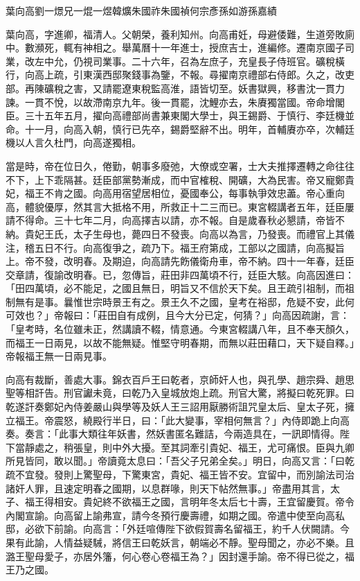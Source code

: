 
\begin{pinyinscope}
葉向高劉一燝兄一焜一煜韓爌朱國祚朱國禎何宗彥孫如游孫嘉績

葉向高，字進卿，福清人。父朝榮，養利知州。向高甫妊，母避倭難，生道旁敗廁中。數瀕死，輒有神相之。舉萬曆十一年進士，授庶吉士，進編修。遷南京國子司業，改左中允，仍視司業事。二十六年，召為左庶子，充皇長子侍班官。礦稅橫行，向高上疏，引東漢西邸聚錢事為鑒，不報。尋擢南京禮部右侍郎。久之，改吏部。再陳礦稅之害，又請罷遼東稅監高淮，語皆切至。妖書獄興，移書沈一貫力諫。一貫不悅，以故滯南京九年。後一貫罷，沈鯉亦去，朱賡獨當國。帝命增閣臣。三十五年五月，擢向高禮部尚書兼東閣大學士，與王錫爵、于慎行、李廷機並命。十一月，向高入朝，慎行已先卒，錫爵堅辭不出。明年，首輔賡亦卒，次輔廷機以人言久杜門，向高遂獨相。

當是時，帝在位日久，倦勤，朝事多廢弛，大僚或空署，士大夫推擇遷轉之命往往不下，上下乖隔甚。廷臣部黨勢漸成，而中官榷稅、開礦，大為民害。帝又寵鄭貴妃，福王不肯之國。向高用宿望居相位，憂國奉公，每事執爭效忠藎。帝心重向高，體貌優厚，然其言大抵格不用，所救正十二三而已。東宮輟講者五年，廷臣屢請不得命。三十七年二月，向高擇吉以請，亦不報。自是歲春秋必懇請，帝皆不納。貴妃王氏，太子生母也，薨四日不發喪。向高以為言，乃發喪。而禮官上其儀注，稽五日不行。向高復爭之，疏乃下。福王府第成，工部以之國請，向高擬旨上。帝不發，改明春。及期迫，向高請先飭儀衛舟車，帝不納。四十一年春，廷臣交章請，復諭改明春。已，忽傳旨，莊田非四萬頃不行，廷臣大駭。向高因進曰：「田四萬頃，必不能足，之國且無日，明旨又不信於天下矣。且王疏引祖制，而祖制無有是事。曩惟世宗時景王有之。景王久不之國，皇考在裕邸，危疑不安，此何可效也？」帝報曰：「莊田自有成例，且今大分已定，何猜？」向高因疏謝，言：「皇考時，名位雖未正，然講讀不輟，情意通。今東宮輟講八年，且不奉天顏久，而福王一日兩見，以故不能無疑。惟堅守明春期，而無以莊田藉口，天下疑自釋。」帝報福王無一日兩見事。

向高有裁斷，善處大事。錦衣百戶王曰乾者，京師奸人也，與孔學、趙宗舜、趙思聖等相訐告。刑官讞未竟，曰乾乃入皇城放炮上疏。刑官大驚，將擬曰乾死罪。曰乾遂訐奏鄭妃內侍姜嚴山與學等及妖人王三詔用厭勝術詛咒皇太后、皇太子死，擁立福王。帝震怒，繞殿行半日，曰：「此大變事，宰相何無言？」內侍即跪上向高奏。奏言：「此事大類往年妖書，然妖書匿名難詰，今兩造具在，一訊即情得。陛下當靜處之，稍張皇，則中外大擾。至其詞牽引貴妃、福王，尤可痛恨。臣與九卿所見皆同，敢以聞。」帝讀竟太息曰：「吾父子兄弟全矣。」明日，向高又言：「曰乾疏不宜發。發則上驚聖母，下驚東宮，貴妃、福王皆不安。宜留中，而別諭法司治諸奸人罪，且速定明春之國期，以息群喙，則天下帖然無事。」帝盡用其言，太子、福王得相安。貴妃終不欲福王之國，言明年冬太后七十壽，王宜留慶賀。帝令內閣宣諭。向高留上諭弗宣，請今冬預行慶壽禮，如期之國。帝遣中使至向高私邸，必欲下前諭。向高言：「外廷喧傳陛下欲假賀壽名留福王，約千人伏闕請。今果有此諭，人情益疑駴，將信王曰乾妖言，朝端必不靜。聖母聞之，亦必不樂。且潞王聖母愛子，亦居外籓，何心卷心卷福王為？」因封還手諭。帝不得已從之，福王乃之國。


\end{pinyinscope}
